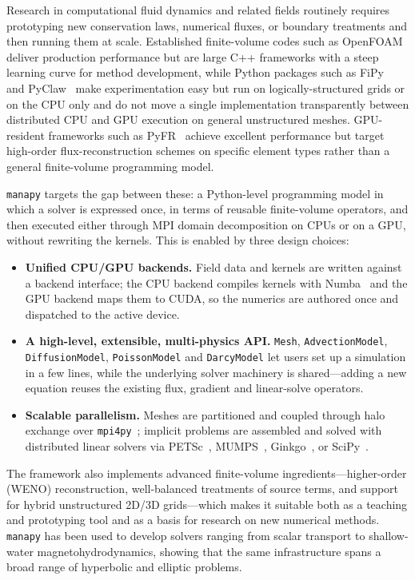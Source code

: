 \documentclass[11pt]{article}
\begin{document}
Research in computational fluid dynamics and related fields routinely requires
prototyping new conservation laws, numerical fluxes, or boundary treatments and
then running them at scale. Established finite-volume codes such as
OpenFOAM~\citep{weller1998} deliver production performance but are large C++
frameworks with a steep learning curve for method development, while Python
packages such as FiPy~\citep{guyer2009fipy} and PyClaw~\citep{ketcheson2012pyclaw}
make experimentation easy but run on logically-structured grids or on the CPU
only and do not move a single implementation transparently between distributed
CPU and GPU execution on general unstructured meshes. GPU-resident frameworks
such as PyFR~\citep{witherden2014pyfr} achieve excellent performance but target
high-order flux-reconstruction schemes on specific element types rather than a
general finite-volume programming model.

\texttt{manapy} targets the gap between these: a Python-level programming model in
which a solver is expressed once, in terms of reusable finite-volume operators,
and then executed either through MPI domain decomposition on CPUs or on a GPU,
without rewriting the kernels. This is enabled by three design choices:

\begin{itemize}
  \item \textbf{Unified CPU/GPU backends.} Field data and kernels are written
  against a backend interface; the CPU backend compiles kernels with
  Numba~\citep{lam2015numba} and the GPU backend maps them to CUDA, so the
  numerics are authored once and dispatched to the active device.
  \item \textbf{A high-level, extensible, multi-physics API.} \texttt{Mesh},
  \texttt{AdvectionModel}, \texttt{DiffusionModel}, \texttt{PoissonModel} and
  \texttt{DarcyModel} let users set up a simulation in a few lines, while the
  underlying solver machinery is shared---adding a new equation reuses the
  existing flux, gradient and linear-solve operators.
  \item \textbf{Scalable parallelism.} Meshes are partitioned and coupled through
  halo exchange over \texttt{mpi4py}~\citep{dalcin2011mpi4py}; implicit problems
  are assembled and solved with distributed linear solvers via
  PETSc~\citep{petsc}, MUMPS~\citep{mumps}, Ginkgo~\citep{ginkgo}, or
  SciPy~\citep{virtanen2020scipy}.
\end{itemize}

The framework also implements advanced finite-volume ingredients---higher-order
(WENO) reconstruction, well-balanced treatments of source terms, and support for
hybrid unstructured 2D/3D grids---which makes it suitable both as a teaching and
prototyping tool and as a basis for research on new numerical methods.
\texttt{manapy} has been used to develop solvers ranging from scalar transport to
shallow-water magnetohydrodynamics, showing that the same infrastructure spans a
broad range of hyperbolic and elliptic problems.
\end{document}
